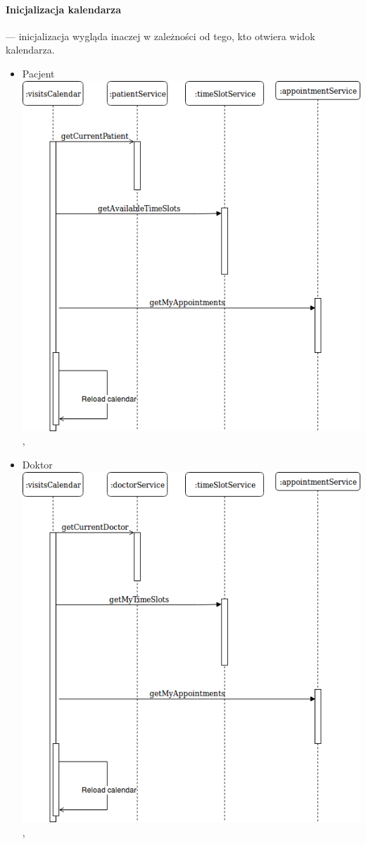 \documentclass[polish,12pt]{aghthesis}
\begin{document}
\paragraph{Inicjalizacja kalendarza} ---
inicjalizacja wygląda inaczej w zależności od tego, kto otwiera widok kalendarza.
\begin{itemize}
    \item Pacjent \\
     \includegraphics[width=\textwidth]{patient-init-cal},
    \item Doktor \\
    \includegraphics[width=\textwidth]{doctor-init-cal},

\end{itemize}
\end{document}
